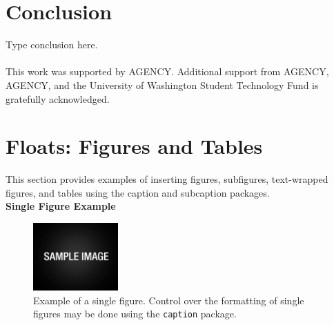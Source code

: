 \documentclass[12pt]{article}
\begin{document}
\section*{Conclusion}

Type conclusion here. \\[12pt]

 \\[12pt]
This work was supported by AGENCY. Additional support from AGENCY, AGENCY, and the University of Washington Student Technology Fund is gratefully acknowledged.

\newpage %

%
%
%
\newpage
\section*{Floats: Figures and Tables}

This section provides examples of inserting figures, subfigures, text-wrapped figures, and tables using the caption and subcaption packages. \\

\noindent\textbf{Single Figure Example}

\begin{figure}[h]
	\begin{center}
		\includegraphics[width=3.25cm]{sample.pdf}
		\caption{Example of a single figure.  Control over the formatting of single figures may be done using the \texttt{caption} package.}
		\label{fig:singlefigure}
	\end{center}
\end{figure}
\end{document}

